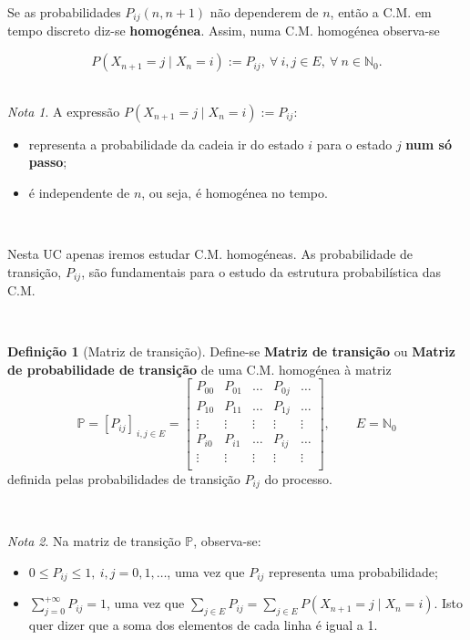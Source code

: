\documentclass[
  11pt,
  a4paper,
]{book}
\theoremstyle{definition}
\newtheorem{definition}{Definição}[chapter]
\theoremstyle{definition}
\theoremstyle{definition}
\theoremstyle{definition}
\theoremstyle{remark}
\newtheorem*{remark}{Nota }
\begin{document}
Se as probabilidades \(P_{ij}(n,n+1)\) não dependerem de \(n\), então a C.M. em tempo discreto diz-se \textbf{homogénea}. Assim, numa C.M. homogénea observa-se

\[P(X_{n+1}=j \mid X_n=i):=P_{ij},~\forall ~i,j \in E, ~\forall ~n \in \mathbb{N}_0.\]
\(\,\)

\begin{remark}

A expressão \(P(X_{n+1}=j \mid X_n=i):=P_{ij}\):

\begin{itemize}
\item
  representa a probabilidade da cadeia ir do estado \(i\) para o estado \(j\) \textbf{num só passo};
\item
  é independente de \(n\), ou seja, é homogénea no tempo.
\end{itemize}

\end{remark}

\(\,\)

Nesta UC apenas iremos estudar C.M. homogéneas. As probabilidade de transição, \(P_{ij}\), são fundamentais para o estudo da estrutura probabilística das C.M.

\(\,\)

\begin{definition}[Matriz de transição]
Define-se \textbf{Matriz de transição} ou \textbf{Matriz de probabilidade de transição} de uma C.M. homogénea à matriz
\[\mathbb{P}=[P_{ij}]_{~i,j \in E}= \begin{bmatrix}
    P_{00} & P_{01} & \dots & P_{0j}  & \dots \\
    P_{10} & P_{11} & \dots & P_{1j}  & \dots \\
    \vdots & \vdots & \vdots & \vdots & \vdots \\
    P_{i0} & P_{i1} & \dots & P_{ij}  & \dots \\
    \vdots & \vdots & \vdots & \vdots & \vdots \\
\end{bmatrix}, \qquad E=\mathbb{N}_0\]
definida pelas probabilidades de transição \(P_{ij}\) do processo.
\end{definition}

\(\,\)

\begin{remark}

Na matriz de transição \(\mathbb{P}\), observa-se:

\begin{itemize}
\item
  \(0 \leq P_{ij} \leq 1, ~i,j=0,1,\ldots\), uma vez que \(P_{ij}\) representa uma probabilidade;
\item
  \(\sum\limits_{j=0}^{+\infty} P_{ij}=1\), uma vez que \(\sum\limits_{j \in E} P_{ij}=\sum\limits_{j \in E}P(X_{n+1}=j \mid X_n=i)\). Isto quer dizer que a soma dos elementos de cada linha é igual a 1.
\end{itemize}

\end{remark}
\end{document}
